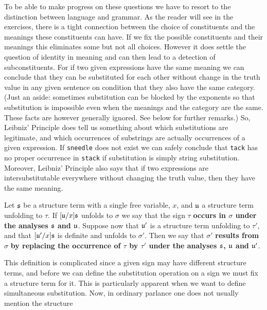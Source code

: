 To be able to make progress on these questions we have to resort to 
the distinction between language and grammar. As the reader will 
see in the exercises, there is a tight connection between the choice 
of constituents and the meanings these constituents can have. If we 
fix the possible constituents and their meanings this eliminates some 
but not all choices.  However it does settle the question of identity 
in meaning and can then lead to a detection of subconstituents. For if 
two given expressions have the same meaning we can conclude that they 
can be substituted for each other without change in the truth value in 
any given sentence on condition that they also have 
the same category. (Just an aside: sometimes substitution can be 
blocked by the exponents so that substitution is impossible even when 
the meanings and the category are the same. These facts are however 
generally ignored. See below for further remarks.) So, Leibniz' 
Principle does tell us something about which substitutions are 
legitimate, and which occurrences of substrings 
are actually occurrences of a given expression. If {\tt sneedle} 
does not exist we can safely conclude that {\tt tack} has no proper 
occurrence in {\tt stack} if substitution is simply string substitution. 
Moreover, Leibniz' Principle also says that if two expressions are 
intersubstitutable everywhere without changing the truth value, 
then they have the same meaning.  
\begin{defn}
Let $\mathfrak{s}$ be a structure term with a single free variable, $x$, and $\mathfrak{u}$ 
a structure term unfolding to $\tau$. If $[\mathfrak{u}/x]\mathfrak{s}$ unfolds to 
$\sigma$ we say that the sign $\tau$ \textbf{occurs in $\sigma$ 
under the analyses $\mathfrak{s}$ and $\mathfrak{u}$}. Suppose now that $\mathfrak{u}'$ is a structure 
term unfolding to $\tau'$, and that $[\mathfrak{u}'/x]\mathfrak{s}$ is definite and unfolds to 
$\sigma'$. Then we say that $\sigma'$ \textbf{results from} $\sigma$ 
\textbf{by replacing the occurrence of $\tau$ by $\tau'$ under the 
analyses $\mathfrak{s}$, $\mathfrak{u}$ and $\mathfrak{u}'$}.
\end{defn}
This definition is complicated since a given sign may have different
structure terms, and before we can define the substitution operation
on a sign we must fix a structure term for it. This is particularly 
apparent when we want to define simultaneous substitution. Now, in 
ordinary parlance one does not usually mention the structure 

